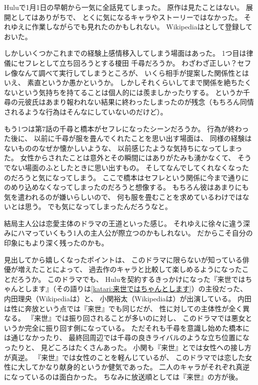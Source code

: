 \documentclass[C:/souji/all-note/note]{subfiles}
\begin{document}
Huluで1月1日の早朝から一気に全話見てしまった。
原作は見たことはない。
展開としてはありがちで、
とくに気になるキャラやストーリーではなかった。
それゆえに作業しながらでも見れたのかもしれない。
Wikipediaは\cite{Wiki013}として登録しておいた。

しかしいくつかこれまでの経験上感情移入してしまう場面はあった。
1つ目は律儀にセフレとして立ち回ろうとする榎田 千尋だろうか。
わざわざ正しい？セフレ像なんて調べて実行してしまうところが、
いくら相手が提案した関係性とはいえ、
素直というか愚かというか。
しかしそれくらいしてまで関係を絶ちたくないという気持ちを持てることは個人的には羨ましかったりする。
というか千尋の元彼氏はあまり報われない結果に終わったしまったのが残念（もちろん同情されるような行為はそんなにしていないのだけど）。

もう1つは第7話の千尋と橋本がセフレになったシーンだろうか。
行為が終わった後に、
以前に千尋が服を畳んでくれたことを思い出す場面は、
同様の経験はないもののなぜか懐かしいような、
以前感じたような気持ちになってしまった。
女性からされたことは意外とその瞬間にはありがたみも湧かなくて、
そうでない場面のふとしたときに思い出すもの。
そしてなんでしてくれなくなったのだろうと気になってしまう。
ここで橋本はセフレという関係に今まで通りにのめり込めなくなってしまったのだろうと想像する。
もちろん彼はあまりにも気を遣われるのが嫌いらしいので、
何も服を畳むことを求めているわけではないとは思う。
でも気になってしまったんだろうなと。

結局主人公は恋愛主体のドラマの王道といった感じ。
それゆえに徐々に違う深みにハマっていくもう1人の主人公が際立つのかもしれない。
だからこそ自分の印象にもより深く残ったのかも。

見出してから嬉しくなったポイントは、
このドラマに限らないが知っている俳優が増えたことによって、
過去作のキャラと比較して楽しめるようになったことだろうか。
このドラマでも、
Huluを契約するきっかけになった『来世ではちゃんとします』（その語りは\ref{katari:来世ではちゃんとします}）の主役だった、
内田理央（Wikipediaは\cite{Wiki014}）と、
小関裕太（Wikipediaは\cite{Wiki015}）が出演している。
内田は性に奔放という点では『来世』でも同じだが、
性に対しての主体性が全く異なる。
『来世』では振り回されることが多いのに対し、
このドラマでは悪女というか完全に振り回す側になっている。
ただそれも千尋を意識し始めた橋本には通じなかったり、
最終回周辺では千尋の良きライバルのような立ち位置になったりと、
見どころはたくさんあった。
小関も『来世』とでは女性への接し方が真逆。
『来世』では女性のことを軽んじているが、
このドラマでは恋した女性に大してかなり献身的というか健気であった。
二人のキャラがそれぞれ真逆になっているのは面白かった。
ちなみに放送順としては『来世』の方が後。
\end{document}
